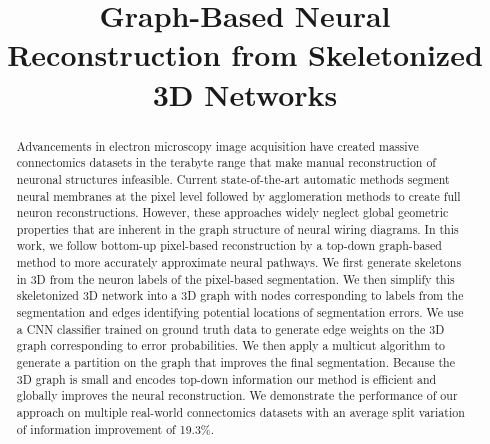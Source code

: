 \documentclass[10pt,twocolumn,letterpaper]{article}
\begin{document}
\title{Graph-Based Neural Reconstruction from Skeletonized 3D Networks}


\maketitle
%

\begin{abstract}
Advancements in electron microscopy image acquisition have created massive connectomics datasets in the terabyte range that make manual reconstruction of neuronal structures infeasible.
Current state-of-the-art automatic methods segment neural membranes at the pixel level followed by agglomeration methods to create full neuron reconstructions.
However, these approaches widely neglect global geometric properties that are inherent in the graph structure of neural wiring diagrams.
In this work, we follow bottom-up pixel-based reconstruction by a top-down graph-based method to more accurately approximate neural pathways.
We first generate skeletons in 3D from the neuron labels of the pixel-based segmentation.
We then simplify this skeletonized 3D network into a 3D graph with nodes corresponding to labels from the segmentation and edges identifying potential locations of segmentation errors.
We use a CNN classifier trained on ground truth data to generate edge weights on the 3D graph corresponding to error probabilities.
We then apply a multicut algorithm to generate a partition on the graph that improves the final segmentation.
Because the 3D graph is small and encodes top-down information our method is efficient and globally improves the neural reconstruction.
We demonstrate the performance of our approach on multiple real-world connectomics datasets with an average split variation of information improvement of 19.3\%.
\end{abstract}














{\small

}
\end{document}
